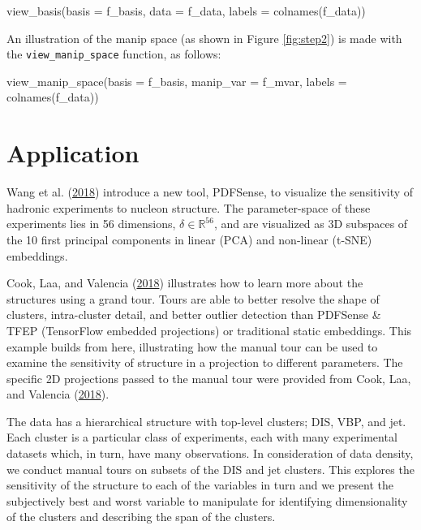 \begin{Schunk}
\begin{Sinput}
view_basis(basis = f_basis, 
           data = f_data,
           labels = colnames(f_data))
\end{Sinput}
\end{Schunk}

\noindent An illustration of the manip space (as shown in Figure
\ref{fig:step2}) is made with the \texttt{view\_manip\_space} function,
as follows:

\begin{Schunk}
\begin{Sinput}

view_manip_space(basis = f_basis, 
                 manip_var = f_mvar, 
                 labels = colnames(f_data))
\end{Sinput}
\end{Schunk}

\hypertarget{sec:application}{%
\section{Application}\label{sec:application}}

Wang et al. (\protect\hyperlink{ref-wang_mapping_2018}{2018}) introduce
a new tool, PDFSense, to visualize the sensitivity of hadronic
experiments to nucleon structure. The parameter-space of these
experiments lies in 56 dimensions, \(\delta \in \mathbb{R}^{56}\), and
are visualized as 3D subspaces of the 10 first principal components in
linear (PCA) and non-linear (t-SNE) embeddings.

Cook, Laa, and Valencia
(\protect\hyperlink{ref-cook_dynamical_2018}{2018}) illustrates how to
learn more about the structures using a grand tour. Tours are able to
better resolve the shape of clusters, intra-cluster detail, and better
outlier detection than PDFSense \& TFEP (TensorFlow embedded
projections) or traditional static embeddings. This example builds from
here, illustrating how the manual tour can be used to examine the
sensitivity of structure in a projection to different parameters. The
specific 2D projections passed to the manual tour were provided from
Cook, Laa, and Valencia
(\protect\hyperlink{ref-cook_dynamical_2018}{2018}).

The data has a hierarchical structure with top-level clusters; DIS, VBP,
and jet. Each cluster is a particular class of experiments, each with
many experimental datasets which, in turn, have many observations. In
consideration of data density, we conduct manual tours on subsets of the
DIS and jet clusters. This explores the sensitivity of the structure to
each of the variables in turn and we present the subjectively best and
worst variable to manipulate for identifying dimensionality of the
clusters and describing the span of the clusters.

